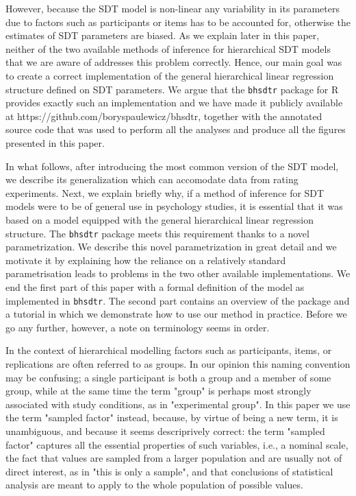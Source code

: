 \documentclass[oneside,a4paper]{article}
\begin{document}
However, because the SDT model is non-linear any variability in its
parameters due to factors such as participants or items has to be
accounted for, otherwise the estimates of SDT parameters are
biased. As we explain later in this paper, neither of the two
available methods of inference for hierarchical SDT models that we are
aware of addresses this problem correctly. Hence, our main goal was to
create a correct implementation of the general hierarchical linear
regression structure defined on SDT parameters. We argue that the
\texttt{bhsdtr} package for R \cite{rstatistical} provides exactly
such an implementation and we have made it publicly available at
https://github.com/boryspaulewicz/bhsdtr, together with the annotated
source code that was used to perform all the analyses and produce all
the figures presented in this paper.


In what follows, after introducing the most common version of the SDT
model, we describe its generalization which can accomodate data from
rating experiments. Next, we explain briefly why, if a method of
inference for SDT models were to be of general use in psychology
studies, it is essential that it was based on a model equipped with
the general hierarchical linear regression structure. The
\texttt{bhsdtr} package meets this requirement thanks to a novel
parametrization. We describe this novel parametrization in great
detail and we motivate it by explaining how the reliance on a
relatively standard parametrisation leads to problems in the two other
available implementations. We end the first part of this paper with a
formal definition of the model as implemented in \texttt{bhsdtr}. The
second part contains an overview of the package and a tutorial in
which we demonstrate how to use our method in practice. Before we go
any further, however, a note on terminology seems in order.


In the context of hierarchical modelling factors such as participants,
items, or replications are often referred to as groups. In our opinion
this naming convention may be confusing; a single participant is both
a group and a member of some group, while at the same time the term
"group" is perhaps most strongly associated with study conditions, as
in "experimental group". In this paper we use the term "sampled
factor" instead, because, by virtue of being a new term, it is
unambiguous, and because it seems descriprively correct: the term
"sampled factor" captures all the essential properties of such
variables, i.e., a nominal scale, the fact that values are sampled
from a larger population and are usually not of direct interest, as in
"this is only a sample", and that conclusions
of statistical analysis are meant to apply to the whole population of
possible values.
\end{document}
